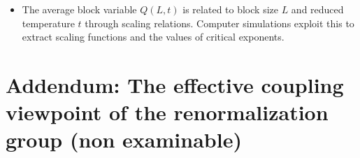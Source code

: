 \documentclass[
  letterpaper,
  enabledeprecatedfontcommands]{report}
\providecommand{\tightlist}{%
  \setlength{\itemsep}{0pt}\setlength{\parskip}{0pt}}
\begin{document}
\begin{itemize}
  \begin{itemize}
  \tightlist
  \item
    The average block variable \(Q(L,t)\) is related to block size \(L\)
    and reduced temperature \(t\) through scaling relations. Computer
    simulations exploit this to extract scaling functions and the values
    of critical exponents.
  \end{itemize}
\end{itemize}

\section{Addendum: The effective coupling viewpoint of the
renormalization group (non
examinable)}\label{addendum-the-effective-coupling-viewpoint-of-the-renormalization-group-non-examinable}
\end{document}

